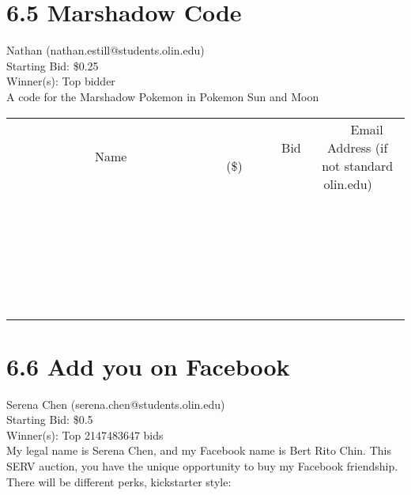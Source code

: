 \documentclass[11pt]{article}
\begin{document}
\section*{6.5 Marshadow Code}
Nathan (nathan.estill@students.olin.edu) \\
Starting Bid: \$0.25 \\
Winner(s): 
Top bidder \\
A code for the Marshadow Pokemon in Pokemon Sun and Moon \\[6ex]
\begin{tabular}{c c c}
~~~~~~~~~~~~~Name~~~~~~~~~~~~~ & ~~~~~~~~~Bid (\$)~~~~~~~~~ & ~~~Email Address (if not standard olin.edu)~~~ \\
 & & \\
\hline
 & & \\
\hline
 & & \\
\hline
 & & \\
\hline
 & & \\
\hline
 & & \\
\hline
 & & \\
\hline
 & & \\
\hline
 & & \\
\hline
 & & \\
\hline
 & & \\
\hline
 & & \\
\hline
 & & \\
\hline
 & & \\
\hline
 & & \\
\hline
 & & \\
\hline
 & & \\
\hline
 & & \\
\hline
 & & \\
\hline
 & & \\
\hline
 & & \\
\hline
 & & \\
\hline
 & & \\
\hline
 & & \\
\hline
 & & \\
\hline
 & & \\
\hline
\end{tabular}
\clearpage
\section*{6.6 Add you on Facebook}
Serena Chen (serena.chen@students.olin.edu) \\
Starting Bid: \$0.5 \\
Winner(s): 
Top 2147483647 bids \\
My legal name is Serena Chen, and my Facebook name is Bert Rito Chin. This SERV auction, you have the unique opportunity to buy my Facebook friendship. There will be different perks, kickstarter style:
\end{document}
